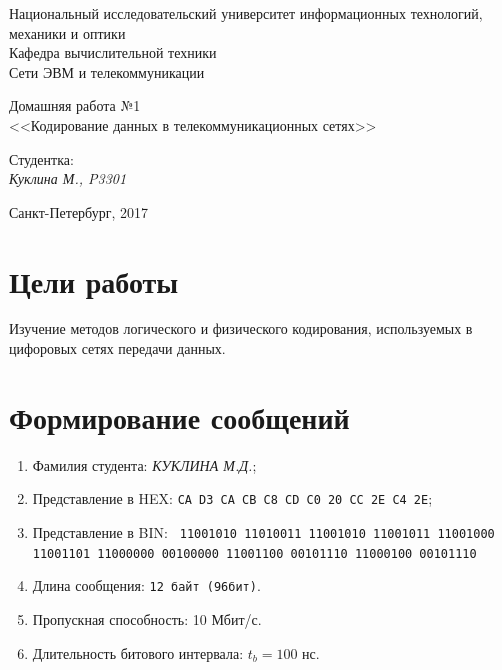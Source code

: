 \documentclass[12pt, a4paper] {ncc}
\begin{document}
\frenchspacing
\pagestyle{empty}
\begin{center}
     Национальный исследовательский университет информационных технологий,
                              механики и оптики\\
                        Кафедра вычислительной техники\\
                          Сети ЭВМ и телекоммуникации
\end{center}
\begin{center}
                            Домашняя работа №1\\
                <<Кодирование данных в телекоммуникационных сетях>>
\end{center}
\begin{flushright}
                                          Студентка:\\
                                                         {\it Куклина М., P3301}
\end{flushright}
\begin{center}
                             Санкт-Петербург, 2017
\end{center}
\newpage


\section{Цели работы}
	Изучение методов логического и физического кодирования, используемых в цифоровых сетях передачи данных.

\section{Формирование сообщений}
\begin{enumerate}
        \item Фамилия студента: \textsl{КУКЛИНА М.Д.};
        \item Представление в HEX: \texttt{CA D3 CA CB C8 CD C0 20 CC 2E C4 2E};
        \item Представление в BIN: \texttt{ 11001010 11010011 11001010 11001011
											   11001000 11001101 11000000 00100000
											   11001100 00101110 11000100 00101110
											 }
        \item Длина сообщения: \texttt{12 байт (96бит)}.
		\item Пропускная способность: 10 Мбит/с.
		\item Длительность битового интервала: $t_b = 100$ нс.
\end{enumerate}
\end{document}
